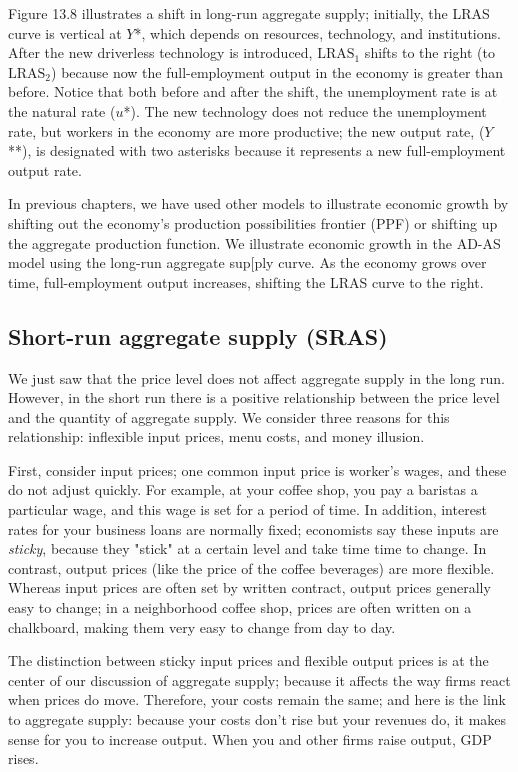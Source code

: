 \documentclass[11pt]{article} %
\begin{document}
Figure 13.8 illustrates a shift in long-run aggregate supply; initially, the LRAS curve is vertical at \(Y\)*, which depends on resources, technology, and institutions. After the new driverless technology is introduced, \(\text{LRAS}_1\) shifts to the right (to \(\text{LRAS}_2\)) because now the full-employment output in the economy is greater than before. Notice that both before and after the shift, the unemployment rate is at the natural rate (\(u\)*). The new technology does not reduce the unemployment rate, but workers in the economy are more productive; the new output rate, (\(Y\)**), is designated with two asterisks because it represents a new full-employment output rate.

In previous chapters, we have used other models to illustrate economic growth by shifting out the economy's production possibilities frontier (PPF) or shifting up the aggregate production function. We illustrate economic growth in the AD-AS model using the long-run aggregate sup[ply curve. As the economy grows over time, full-employment output increases, shifting the LRAS curve to the right.

\subsection*{Short-run aggregate supply (SRAS)}
We just saw that the price level does not affect aggregate supply in the long run. However, in the short run there is a positive relationship between the price level and the quantity of aggregate supply. We consider three reasons for this relationship: inflexible input prices, menu costs, and money illusion.

First, consider input prices; one common input price is worker's wages, and these do not adjust quickly. For example, at your coffee shop, you pay a baristas a particular wage, and this wage is set for a period of time. In addition, interest rates for your business loans are normally fixed; economists say these inputs are \textit{sticky}, because they "stick" at a certain level and take time time to change. In contrast, output prices (like the price of the coffee beverages) are more flexible. Whereas input prices are often set by written contract, output prices generally easy to change; in a neighborhood coffee shop, prices are often written on a chalkboard, making them very easy to change from day to day.

The distinction between sticky input prices and flexible output prices is at the center of our discussion of aggregate supply; because it affects the way firms react when prices do move. Therefore, your costs remain the same; and here is the link to aggregate supply: because your costs don't rise but your revenues do, it makes sense for you to increase output. When you and other firms raise output, GDP rises.
\end{document}
